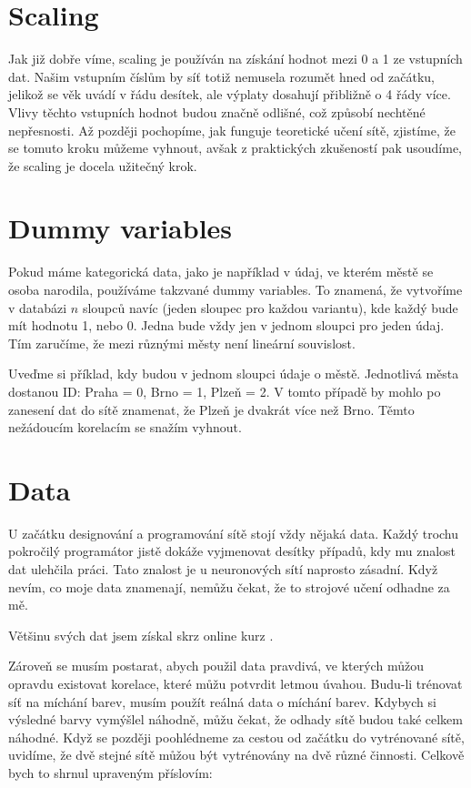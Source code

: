 \documentclass[12pt,a4paper]{report}
\begin{document}
	\section{Scaling}
	Jak již dobře víme, scaling je používán na získání hodnot mezi 0 a 1 ze vstupních dat. Našim vstupním číslům by síť totiž nemusela rozumět hned od začátku, jelikož se věk uvádí v řádu desítek, ale výplaty dosahují přibližně o 4 řády více. Vlivy těchto vstupních hodnot budou značně odlišné, což způsobí nechtěné nepřesnosti. Až později pochopíme, jak funguje teoretické učení sítě, zjistíme, že se tomuto kroku můžeme vyhnout, avšak z praktických zkušeností pak usoudíme, že scaling je docela užitečný krok.
	\section{Dummy variables}
	Pokud máme kategorická data, jako je například v údaj, ve kterém městě se osoba narodila, používáme takzvané dummy variables. To znamená, že vytvoříme v databázi $n$ sloupců navíc (jeden sloupec pro každou variantu), kde každý bude mít hodnotu 1, nebo 0. Jedna bude vždy jen v jednom sloupci pro jeden údaj. Tím zaručíme, že mezi různými městy není lineární souvislost.
	
	Uveďme si příklad, kdy budou v jednom sloupci údaje o městě. Jednotlivá města dostanou ID: Praha = 0, Brno = 1, Plzeň = 2. V tomto případě by mohlo po zanesení dat do sítě znamenat, že Plzeň je dvakrát více než Brno. Těmto nežádoucím korelacím se snažím vyhnout.
	\section{Data}
	U začátku designování a programování sítě stojí vždy nějaká data. Každý trochu pokročilý programátor jistě dokáže vyjmenovat desítky případů, kdy mu znalost dat ulehčila práci. Tato znalost je u neuronových sítí naprosto zásadní. Když nevím, co moje data znamenají, nemůžu čekat, že to strojové učení odhadne za mě.
	
	Většinu svých dat jsem získal skrz online kurz \cite{eremenko}.
	
	Zároveň se musím postarat, abych použil data pravdivá, ve kterých můžou opravdu existovat korelace, které můžu potvrdit letmou úvahou. Budu-li trénovat síť na míchání barev, musím použít reálná data o míchání barev. Kdybych si výsledné barvy vymýšlel náhodně, můžu čekat, že odhady sítě budou také celkem náhodné. Když se později poohlédneme za cestou od začátku do vytrénované sítě, uvidíme, že dvě stejné sítě můžou být vytrénovány na dvě různé činnosti. Celkově bych to shrnul upraveným příslovím: 
\end{document}
